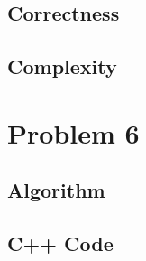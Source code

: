 \documentclass[]{article}
\begin{document}
        \subsection{Correctness}
        \subsection{Complexity}
    
    \section{Problem 6}
        \subsection{Algorithm}
            \paragraph{}
        \subsection{C++ Code}
            
    
    
\end{document}
